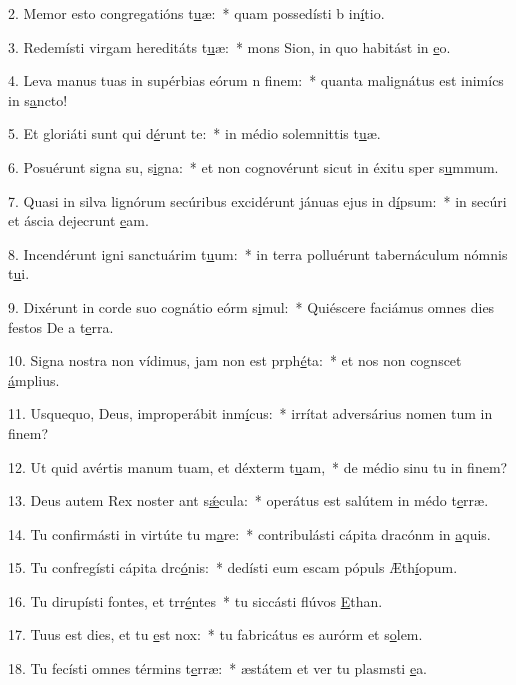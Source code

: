 2. Memor esto congregatións t\uline{u}æ:~* quam possedísti b in\uline{í}tio.\par 
3. Redemísti virgam hereditáts t\uline{u}æ:~* mons Sion, in quo habitást in \uline{e}o.\par 
4. Leva manus tuas in supérbias eórum n f\uline{i}nem:~* quanta malignátus est inimícs in s\uline{a}ncto!\par 
5. Et gloriáti sunt qui d\uline{é}runt te:~* in médio solemnittis t\uline{u}æ.\par 
6. Posuérunt signa su, s\uline{i}gna:~* et non cognovérunt sicut in éxitu sper s\uline{u}mmum.\par 
7. Quasi in silva lignórum secúribus excidérunt jánuas ejus in d\uline{í}psum:~* in secúri et áscia dejecrunt \uline{e}am.\par 
8. Incendérunt igni sanctuárim t\uline{u}um:~* in terra polluérunt tabernáculum nómnis t\uline{u}i.\par 
9. Dixérunt in corde suo cognátio eórm s\uline{i}mul:~* Quiéscere faciámus omnes dies festos De a t\uline{e}rra.\par 
10. Signa nostra non vídimus, jam non est prph\uline{é}ta:~* et nos non cognscet \uline{á}mplius.\par 
11. Usquequo, Deus, improperábit inm\uline{í}cus:~* irrítat adversárius nomen tum in f\uline{i}nem?\par 
12. Ut quid avértis manum tuam, et déxterm t\uline{u}am,~* de médio sinu tu in f\uline{i}nem?\par 
13. Deus autem Rex noster ant s\uline{ǽ}cula:~* operátus est salútem in médo t\uline{e}rræ.\par 
14. Tu confirmásti in virtúte tu m\uline{a}re:~* contribulásti cápita dracónm in \uline{a}quis.\par 
15. Tu confregísti cápita drc\uline{ó}nis:~* dedísti eum escam pópuls Æth\uline{í}opum.\par 
16. Tu dirupísti fontes, et trr\uline{é}ntes~* tu siccásti flúvos \uline{E}than.\par 
17. Tuus est dies, et tu \uline{e}st nox:~* tu fabricátus es aurórm et s\uline{o}lem.\par 
18. Tu fecísti omnes términs t\uline{e}rræ:~* æstátem et ver tu plasmsti \uline{e}a.\par 
